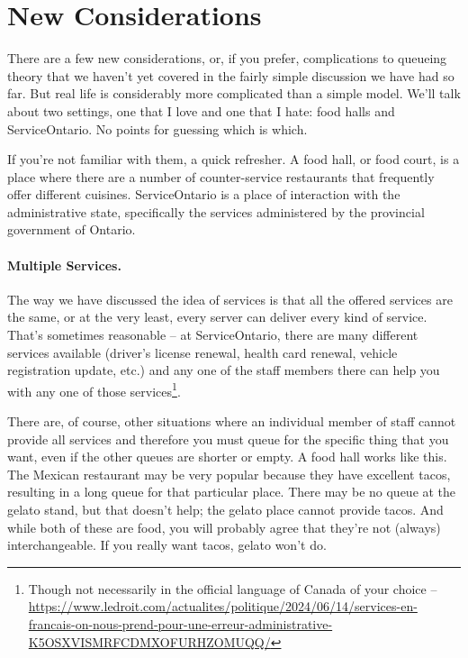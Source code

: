 

\newcommand{\FPP}{FastPass\nolinebreak\hspace{-.05em}\raisebox{.4ex}{\tiny\bf +}\nolinebreak\hspace{-.10em}\raisebox{.4ex}{\tiny\bf +}}
\def\FPP{{FastPass\nolinebreak[4]\hspace{-.05em}\raisebox{.4ex}{\tiny\bf ++}}}




\section*{New Considerations}

There are a few new considerations, or, if you prefer, complications to queueing theory that we haven't yet covered in the fairly simple discussion we have had so far. But real life is considerably more complicated than a simple model. We'll talk about two settings, one that I love and one that I hate: food halls and ServiceOntario. No points for guessing which is which.

If you're not familiar with them, a quick refresher. A food hall, or food court, is a place where there are a number of counter-service restaurants that frequently offer different cuisines. ServiceOntario is a place of interaction with the administrative state, specifically the services administered by the provincial government of Ontario.

\paragraph{Multiple Services.} The way we have discussed the idea of services is that all the offered services are the same, or at the very least, every server can deliver every kind of service. That's sometimes reasonable -- at ServiceOntario, there are many different services available (driver's license renewal, health card renewal, vehicle registration update, etc.) and any one of the staff members there can help you with any one of those services\footnote{Though not necessarily in the official language of Canada of your choice -- \url{https://www.ledroit.com/actualites/politique/2024/06/14/services-en-francais-on-nous-prend-pour-une-erreur-administrative-K5OSXVISMRFCDMXOFURHZOMUQQ/}}.

There are, of course, other situations where an individual member of staff cannot provide all services and therefore you must queue for the specific thing that you want, even if the other queues are shorter or empty. A food hall works like this. The Mexican restaurant may be very popular because they have excellent tacos, resulting in a long queue for that particular place. There may be no queue at the gelato stand, but that doesn't help; the gelato place cannot provide tacos. And while both of these are food, you will probably agree that they're not (always) interchangeable. If you really want tacos, gelato won't do.

